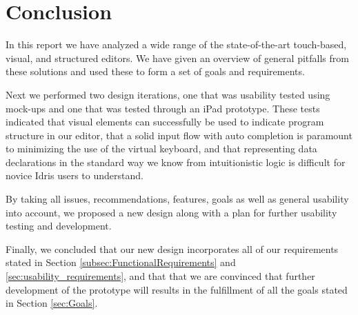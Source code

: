 \chapter{Conclusion}
\label{sec:Conclusion}

In this report we have analyzed a wide range of the state-of-the-art touch-based, visual, and structured
editors. We have given an overview of general pitfalls from these solutions and used these to form a set of goals and requirements. 

Next we performed two design iterations, one that was usability tested using
mock-ups and one that was tested through an iPad prototype. These tests
indicated that visual elements can successfully be used to indicate program structure in our editor, that
a solid input flow with auto completion is paramount to minimizing the use of
the virtual keyboard, and that representing data declarations in the standard
way we know from intuitionistic logic is difficult for novice Idris users to
understand.

By taking all issues, recommendations, features, goals as well as general usability into account, we proposed a new design along with a plan for further usability testing and development.

Finally, we concluded that our new design incorporates all of our requirements stated in
Section \ref{subsec:FunctionalRequirements} and
\ref{sec:usability_requirements}, and that that we are convinced that further development
of the prototype will results in the fulfillment of all the goals stated in
Section \ref{sec:Goals}.